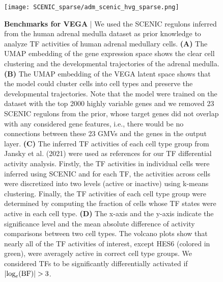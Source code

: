 \begin{figure}[H]
    \centering
    \hspace*{-2mm}
    \texttt{[image: SCENIC\_sparse/adm\_scenic\_hvg\_sparse.png]}
    \caption{\small{\textbf{Benchmarks for VEGA} | We used the SCENIC regulons inferred from the human adrenal medulla dataset as prior knowledge to analyze TF activities of human adrenal medullary cells. \textbf{(A)} The UMAP embedding of the gene expression space shows the clear cell clustering and the developmental trajectories of the adrenal medulla. \textbf{(B)} The UMAP embedding of the VEGA latent space shows that the model could cluster cells into cell types and preserve the developmental trajectories. Note that the model were trained on the dataset with the top 2000 highly variable genes and we removed 23 SCENIC regulons from the prior, whose target genes did not overlap with any considered gene features, i.e., there would be no connections between these 23 GMVs and the genes in the output layer. \textbf{(C)} The inferred TF activities of each cell type group from Jansky et al. (2021) were used as references for our TF differential activity analysis. Firstly, the TF activities in individual cells were inferred using SCENIC and for each TF, the activities across cells were discretized into two levels (active or inactive) using k-means clustering. Finally, the TF activities of each cell type group were determined by computing the fraction of cells whose TF states were active in each cell type. \textbf{(D)} The x-axis and the y-axis indicate the significance level and the mean absolute difference of activity comparisons between two cell types. The volcano plots show that nearly all of the TF activities of interest, except HES6 (colored in green), were averagely active in correct cell type groups. We considered TFs to be significantly differentially activated if $|\textnormal{log}_e(\textnormal{BF})|>3$.}}
    \label{fig:sparse_adm_scenic}
\end{figure}

\newpage

